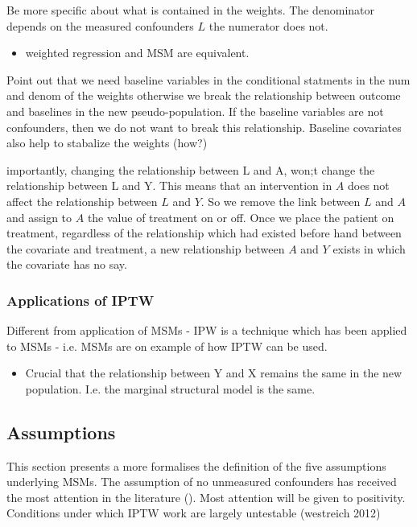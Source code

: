 \documentclass[11pt]{article}
\providecommand{\tightlist}{%
      \setlength{\itemsep}{0pt}\setlength{\parskip}{0pt}}
\begin{document}
Be more specific about what is contained in the weights. The denominator
depends on the measured confounders \(L\) the numerator does not.

\begin{itemize}
\tightlist
\item
  weighted regression and MSM are equivalent.
\end{itemize}

Point out that we need baseline variables in the conditional statments
in the num and denom of the weights otherwise we break the relationship
between outcome and baselines in the new pseudo-population. If the
baseline variables are not confounders, then we do not want to break
this relationship. Baseline covariates also help to stabalize the
weights (how?)

importantly, changing the relationship between L and A, won;t change the
relationship between L and Y. This means that an intervention in \(A\)
does not affect the relationship between \(L\) and \(Y\). So we remove
the link between \(L\) and \(A\) and assign to \(A\) the value of
treatment on or off. Once we place the patient on treatment, regardless
of the relationship which had existed before hand between the covariate
and treatment, a new relationship between \(A\) and \(Y\) exists in
which the covariate has no say.

\subsubsection{Applications of IPTW}\label{applications-of-iptw}

Different from application of MSMs - IPW is a technique which has been
applied to MSMs - i.e. MSMs are on example of how IPTW can be used.

\begin{itemize}
\tightlist
\item
  Crucial that the relationship between Y and X remains the same in the
  new population. I.e. the marginal structural model is the same.
\end{itemize}

    \subsection{Assumptions}\label{assumptions}

This section presents a more formalises the definition of the five
assumptions underlying MSMs. The assumption of no unmeasured confounders
has received the most attention in the literature (). Most attention
will be given to positivity. Conditions under which IPTW work are
largely untestable (westreich 2012)
\end{document}
